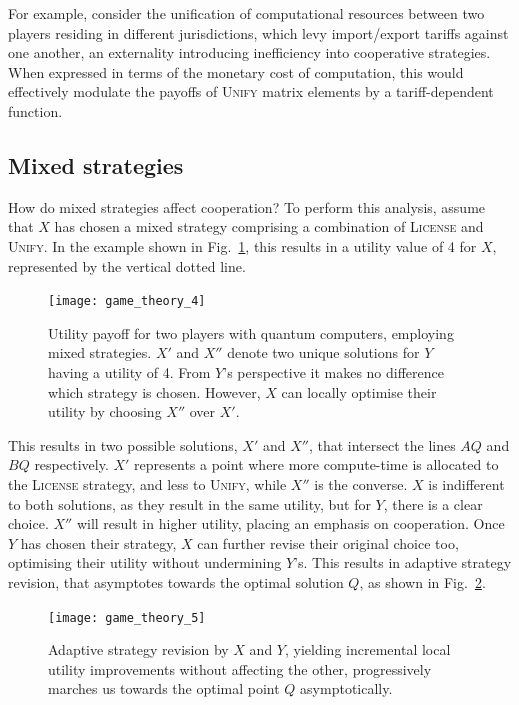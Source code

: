 For example, consider the unification of computational resources between two players residing in different jurisdictions, which levy import/export tariffs against one another, an externality introducing inefficiency into cooperative strategies. When expressed in terms of the monetary cost of computation, this would effectively modulate the payoffs of \textsc{Unify} matrix elements by a tariff-dependent function.

\subsection{Mixed strategies}

How do mixed strategies affect cooperation? To perform this analysis, assume that $X$ has chosen a mixed strategy comprising a combination of \textsc{License} and \textsc{Unify}. In the example shown in Fig.~\ref{fig:game_theory_4}, this results in a utility value of 4 for $X$, represented by the vertical dotted line.

\begin{figure}[!htbp]
\texttt{[image: game\_theory\_4]}
\captionspacefig \caption{Utility payoff for two players with quantum computers, employing mixed strategies. $X'$ and $X''$ denote two unique solutions for $Y$ having a utility of 4. From $Y$'s perspective it makes no difference which strategy is chosen. However, $X$ can locally optimise their utility by choosing $X''$ over $X'$.}\label{fig:game_theory_4}
\end{figure}

This results in two possible solutions, $X'$ and $X''$, that intersect the lines $AQ$ and $BQ$ respectively. $X'$ represents a point where more compute-time is allocated to the \textsc{License} strategy, and less to \textsc{Unify}, while $X''$ is the converse. $X$ is indifferent to both solutions, as they result in the same utility, but for $Y$, there is a clear choice. $X''$ will result in higher utility, placing an emphasis on cooperation. Once $Y$ has chosen their strategy, $X$ can further revise their original choice too, optimising their utility without undermining $Y$'s. This results in adaptive strategy revision, that asymptotes towards the optimal solution $Q$, as shown in Fig.~\ref{fig:game_theory_5}.

\begin{figure}[!htbp]
\texttt{[image: game\_theory\_5]}
\captionspacefig \caption{Adaptive strategy revision by $X$ and $Y$, yielding incremental local utility improvements without affecting the other, progressively marches us towards the optimal point $Q$ asymptotically.}\label{fig:game_theory_5}
\end{figure}

